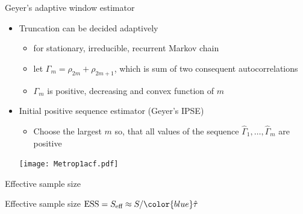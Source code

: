 \documentclass[finnish,english,t]{beamer}
\def\eff{\text{eff}}
\def\ESS{\text{ESS}}
\begin{document}
\begin{frame}{Geyer's adaptive window estimator}

  \begin{itemize}
  \item Truncation can be decided adaptively
    \begin{itemize}
    \item for stationary, irreducible, recurrent Markov chain
    \item let $\Gamma_m=\rho_{2m}+\rho_{2m+1}$, which is sum of two
      consequent autocorrelations
    \item $\Gamma_m$ is positive, decreasing and convex function of $m$
    \end{itemize}
    \vspace{0.5\baselineskip}
  \item<2-> Initial positive sequence estimator (Geyer's IPSE)
      \begin{itemize}
        \item Choose the largest $m$ so, that all values of the sequence
        $\hat{\Gamma}_1, \ldots, \hat{\Gamma}_m$ are positive
      \end{itemize}
  \vspace{0.5\baselineskip}
      \texttt{[image: Metrop1acf.pdf]}
  \end{itemize}
\end{frame}


\begin{frame}
  
   {\Large\color{navyblue} Effective sample size}

   Effective sample size $\ESS = S_\eff \approx S/{\color{blue}\hat{\tau}}$\\
   
\end{frame}
\end{document}
